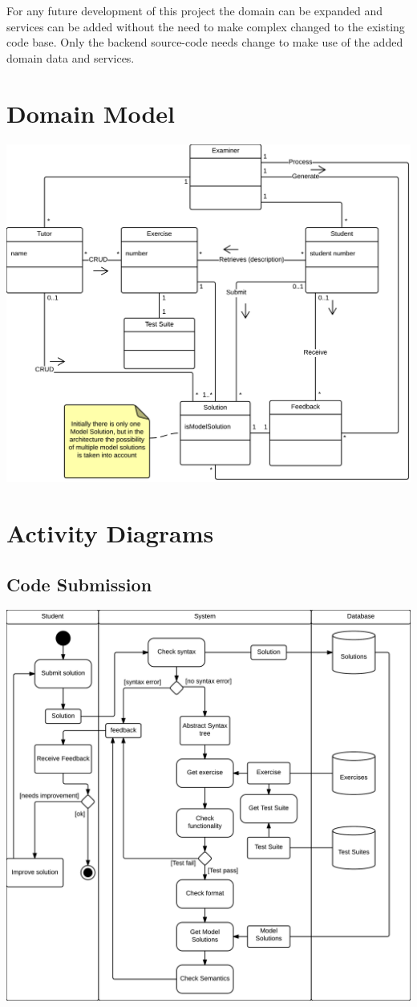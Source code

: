 For any future development of this project
the domain can be expanded
and services can be added
without the need to make complex changed to the existing code base.
Only the backend \gls{source-code} needs change
to make use of the added domain data and services.

\section{Domain Model}
\includegraphics[scale=0.8]{diagrams-images/domain-model}



\section{Activity Diagrams}
\subsection{Code Submission}
\includegraphics[scale=0.8]{diagrams-images/code-submission-activity-diagram}

